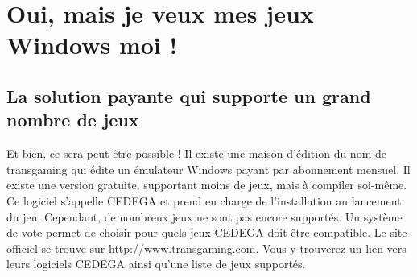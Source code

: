 \section{Oui, mais je veux mes jeux Windows moi !}
\label{RefWineJeux}
\subsection{La solution payante qui supporte un grand nombre de jeux}
Et bien, ce sera peut-être possible ! Il existe une maison d'édition du nom de transgaming qui édite un émulateur Windows payant par abonnement mensuel. Il existe une version gratuite, supportant moins de jeux, mais à compiler soi-même. Ce logiciel s'appelle CEDEGA et prend en charge de l'installation au lancement du jeu. Cependant, de nombreux jeux ne sont pas encore supportés. Un système de vote permet de choisir pour quels jeux CEDEGA doit être compatible. Le site officiel se trouve sur \url{http://www.transgaming.com}. Vous y trouverez un lien vers leurs logiciels CEDEGA ainsi qu'une liste de jeux supportés.
